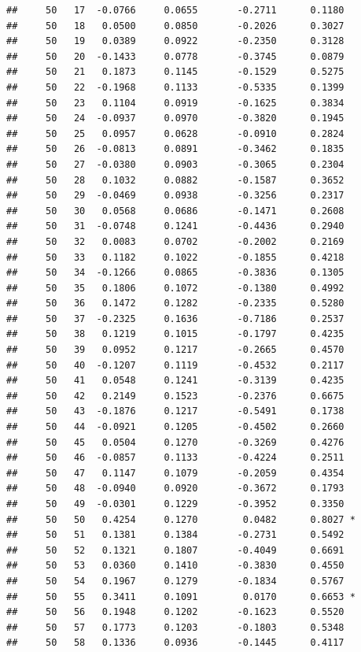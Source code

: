 \documentclass[
]{article}
\begin{document}
\begin{verbatim}
##     50   17  -0.0766     0.0655       -0.2711      0.1180  
##     50   18   0.0500     0.0850       -0.2026      0.3027  
##     50   19   0.0389     0.0922       -0.2350      0.3128  
##     50   20  -0.1433     0.0778       -0.3745      0.0879  
##     50   21   0.1873     0.1145       -0.1529      0.5275  
##     50   22  -0.1968     0.1133       -0.5335      0.1399  
##     50   23   0.1104     0.0919       -0.1625      0.3834  
##     50   24  -0.0937     0.0970       -0.3820      0.1945  
##     50   25   0.0957     0.0628       -0.0910      0.2824  
##     50   26  -0.0813     0.0891       -0.3462      0.1835  
##     50   27  -0.0380     0.0903       -0.3065      0.2304  
##     50   28   0.1032     0.0882       -0.1587      0.3652  
##     50   29  -0.0469     0.0938       -0.3256      0.2317  
##     50   30   0.0568     0.0686       -0.1471      0.2608  
##     50   31  -0.0748     0.1241       -0.4436      0.2940  
##     50   32   0.0083     0.0702       -0.2002      0.2169  
##     50   33   0.1182     0.1022       -0.1855      0.4218  
##     50   34  -0.1266     0.0865       -0.3836      0.1305  
##     50   35   0.1806     0.1072       -0.1380      0.4992  
##     50   36   0.1472     0.1282       -0.2335      0.5280  
##     50   37  -0.2325     0.1636       -0.7186      0.2537  
##     50   38   0.1219     0.1015       -0.1797      0.4235  
##     50   39   0.0952     0.1217       -0.2665      0.4570  
##     50   40  -0.1207     0.1119       -0.4532      0.2117  
##     50   41   0.0548     0.1241       -0.3139      0.4235  
##     50   42   0.2149     0.1523       -0.2376      0.6675  
##     50   43  -0.1876     0.1217       -0.5491      0.1738  
##     50   44  -0.0921     0.1205       -0.4502      0.2660  
##     50   45   0.0504     0.1270       -0.3269      0.4276  
##     50   46  -0.0857     0.1133       -0.4224      0.2511  
##     50   47   0.1147     0.1079       -0.2059      0.4354  
##     50   48  -0.0940     0.0920       -0.3672      0.1793  
##     50   49  -0.0301     0.1229       -0.3952      0.3350  
##     50   50   0.4254     0.1270        0.0482      0.8027 *
##     50   51   0.1381     0.1384       -0.2731      0.5492  
##     50   52   0.1321     0.1807       -0.4049      0.6691  
##     50   53   0.0360     0.1410       -0.3830      0.4550  
##     50   54   0.1967     0.1279       -0.1834      0.5767  
##     50   55   0.3411     0.1091        0.0170      0.6653 *
##     50   56   0.1948     0.1202       -0.1623      0.5520  
##     50   57   0.1773     0.1203       -0.1803      0.5348  
##     50   58   0.1336     0.0936       -0.1445      0.4117  

\end{verbatim}
\end{document}
